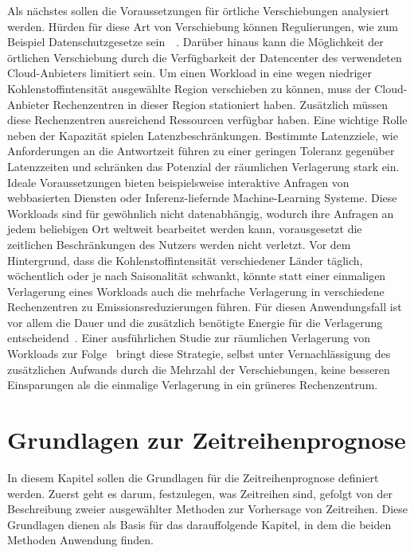 Als nächstes sollen die Voraussetzungen für örtliche Verschiebungen analysiert werden.
Hürden für diese Art von Verschiebung können Regulierungen, wie zum Beispiel Datenschutzgesetze sein~\cite{Sukprasert.2023}~\cite{Koningstein.18.5.2021}.
Darüber hinaus kann die Möglichkeit der örtlichen Verschiebung durch die Verfügbarkeit der Datencenter des verwendeten Cloud-Anbieters limitiert sein.
Um einen Workload in eine wegen niedriger Kohlenstoffintensität ausgewählte Region verschieben zu können, muss der Cloud-Anbieter Rechenzentren in dieser Region stationiert haben.
Zusätzlich müssen diese Rechenzentren ausreichend Ressourcen verfügbar haben.
Eine wichtige Rolle neben der Kapazität spielen Latenzbeschränkungen.
Bestimmte Latenzziele, wie Anforderungen an die Antwortzeit führen zu einer geringen Toleranz gegenüber Latenzzeiten und schränken das Potenzial der räumlichen Verlagerung stark ein.
Ideale Voraussetzungen bieten beispielsweise interaktive Anfragen von webbasierten Diensten oder Inferenz-liefernde Machine-Learning Systeme.
Diese Workloads sind für gewöhnlich nicht datenabhängig, wodurch ihre Anfragen an jedem beliebigen Ort weltweit bearbeitet werden kann, vorausgesetzt die zeitlichen Beschränkungen des Nutzers werden nicht verletzt.
Vor dem Hintergrund, dass die Kohlenstoffintensität verschiedener Länder täglich, wöchentlich oder je nach Saisonalität schwankt, könnte statt einer einmaligen Verlagerung eines Workloads auch die mehrfache Verlagerung in verschiedene Rechenzentren zu Emissionsreduzierungen führen.
Für diesen Anwendungsfall ist vor allem die Dauer und die zusätzlich benötigte Energie für die Verlagerung entscheidend~\cite{Sukprasert.2023}.
Einer ausführlichen Studie zur räumlichen Verlagerung von Workloads zur Folge~\cite{Sukprasert.2023} bringt diese Strategie, selbst unter Vernachlässigung des zusätzlichen Aufwands durch die Mehrzahl der Verschiebungen, keine besseren Einsparungen als die einmalige Verlagerung in ein grüneres Rechenzentrum.
\chapter{Grundlagen zur Zeitreihenprognose}\label{CAP:tsf_basics}
\noindent In diesem Kapitel sollen die Grundlagen für die Zeitreihenprognose definiert werden.
Zuerst geht es darum, festzulegen, was Zeitreihen sind, gefolgt von der Beschreibung zweier ausgewählter Methoden zur Vorhersage von Zeitreihen.
Diese Grundlagen dienen als Basis für das darauffolgende Kapitel, in dem die beiden Methoden Anwendung finden.
